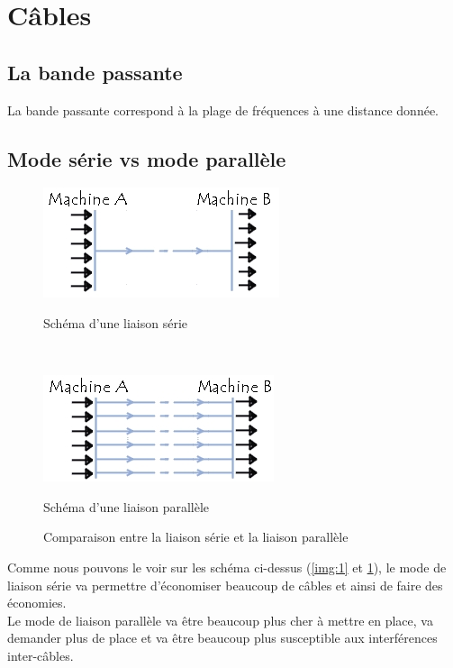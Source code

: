 \section{Câbles}
\subsection{La bande passante}
La bande passante correspond à la plage de fréquences à une distance donnée.
\subsection{Mode série vs mode parallèle}
\begin{figure}[H]
  \centering
  \begin{minipage}{.45\textwidth}
    \includegraphics[width=\textwidth]{img/serie.jpg}
    \caption{Schéma d'une liaison série}
    \label{img:1}
  \end{minipage}
  ~
  \begin{minipage}{.45\textwidth}
    \includegraphics[width=\textwidth]{img/parallele.jpg}
    \caption{Schéma d'une liaison parallèle}
    \label{img:2}
  \end{minipage}
  \caption*{Comparaison entre la liaison série et la liaison parallèle}
\end{figure}
Comme nous pouvons le voir sur les schéma ci-dessus (\ref{img:1} et \ref{img:2}), le mode de liaison série va permettre d'économiser beaucoup de câbles et ainsi de faire des économies.\\
Le mode de liaison parallèle va être beaucoup plus cher à mettre en place, va demander plus de place et va être beaucoup plus susceptible aux interférences inter-câbles.
